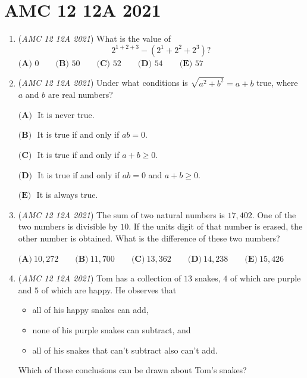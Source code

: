 \section{AMC 12 12A 2021}
        \begin{enumerate}
        	\item (\textit{AMC 12 12A 2021}) What is the value of
 \[2^{1+2+3}-(2^1+2^2+2^3)?\]
$\textbf{(A) }0 \qquad \textbf{(B) }50 \qquad \textbf{(C) }52 \qquad \textbf{(D) }54 \qquad \textbf{(E) }57$


	\item (\textit{AMC 12 12A 2021}) Under what conditions is $\sqrt{a^2+b^2}=a+b$ true, where $a$ and $b$ are real numbers?


 $\textbf{(A) }$ It is never true.


 $\textbf{(B) }$ It is true if and only if $ab=0$.


 $\textbf{(C) }$ It is true if and only if $a+b\ge 0$.


 $\textbf{(D) }$ It is true if and only if $ab=0$ and $a+b\ge 0$.


 $\textbf{(E) }$ It is always true.


 

	\item (\textit{AMC 12 12A 2021}) The sum of two natural numbers is $17{,}402$. One of the two numbers is divisible by $10$. If the units digit of that number is erased, the other number is obtained. What is the difference of these two numbers?


 $\textbf{(A)} ~10{,}272\qquad\textbf{(B)} ~11{,}700\qquad\textbf{(C)} ~13{,}362\qquad\textbf{(D)} ~14{,}238\qquad\textbf{(E)} ~15{,}426$


	\item (\textit{AMC 12 12A 2021}) Tom has a collection of $13$ snakes, $4$ of which are purple and $5$ of which are happy. He observes that


 
            \begin{itemize}
        \item all of his happy snakes can add,
            \end{itemize}
            
            \begin{itemize}
        \item none of his purple snakes can subtract, and
            \end{itemize}
            
            \begin{itemize}
        \item all of his snakes that can't subtract also can't add.
            \end{itemize}
            Which of these conclusions can be drawn about Tom's snakes?



\end{enumerate}
